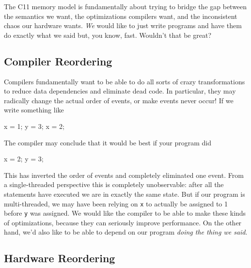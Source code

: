 \documentclass[a4paper,]{book}
\newenvironment{Shaded}{\begin{snugshade}}{\end{snugshade}}
\newcommand{\DecValTok}[1]{\textcolor[rgb]{0.00,0.00,0.81}{{#1}}}
\newcommand{\NormalTok}[1]{{#1}}
\begin{document}
The C11 memory model is fundamentally about trying to bridge the gap
between the semantics we want, the optimizations compilers want, and the
inconsistent chaos our hardware wants. \emph{We} would like to just
write programs and have them do exactly what we said but, you know,
fast. Wouldn't that be great?

\subsection{Compiler Reordering}\label{compiler-reordering}

Compilers fundamentally want to be able to do all sorts of crazy
transformations to reduce data dependencies and eliminate dead code. In
particular, they may radically change the actual order of events, or
make events never occur! If we write something like

\begin{Shaded}
\begin{Highlighting}[]
\NormalTok{x = }\DecValTok{1}\NormalTok{;}
\NormalTok{y = }\DecValTok{3}\NormalTok{;}
\NormalTok{x = }\DecValTok{2}\NormalTok{;}
\end{Highlighting}
\end{Shaded}

The compiler may conclude that it would be best if your program did

\begin{Shaded}
\begin{Highlighting}[]
\NormalTok{x = }\DecValTok{2}\NormalTok{;}
\NormalTok{y = }\DecValTok{3}\NormalTok{;}
\end{Highlighting}
\end{Shaded}

This has inverted the order of events and completely eliminated one
event. From a single-threaded perspective this is completely
unobservable: after all the statements have executed we are in exactly
the same state. But if our program is multi-threaded, we may have been
relying on \texttt{x} to actually be assigned to 1 before \texttt{y} was
assigned. We would like the compiler to be able to make these kinds of
optimizations, because they can seriously improve performance. On the
other hand, we'd also like to be able to depend on our program
\emph{doing the thing we said}.

\subsection{Hardware Reordering}\label{hardware-reordering}
\end{document}
